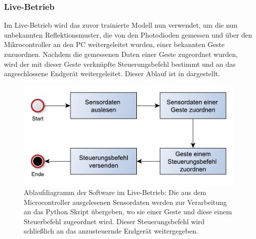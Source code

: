 \subsubsection*{Live-Betrieb}
Im Live-Betrieb wird das zuvor trainierte Modell nun verwendet, um die nun unbekannten Reflektionsmuster, die von den Photodioden gemessen und über den Mikrocontroller an den PC weitergeleitet wurden, einer bekannten Geste zuzuordnen. Nachdem die gemessenen Daten einer Geste zugeordnet wurden, wird der mit dieser Geste verknüpfte Steuerungsbefehl bestimmt und an das angeschlossene Endgerät weitergeleitet. Dieser Ablauf ist in  dargestellt.

\begin{figure}[h]
	\centering
	\includegraphics[scale=0.75]{../figures/AblaufSteuerung.pdf}
	\caption{Ablaufdiagramm der Software im Live-Betrieb: Die aus dem Microcontroller ausgelesenen Sensordaten werden zur Verarbeitung an das Python Skript übergeben, wo sie einer Geste und diese einem Steuerbefehl zugeordnet wird. Dieser Steuerungsbefehl wird schließlich an das anzusteuernde Endgerät weitergegeben.}
	\label{fig:AblaufSteuerung}
\end{figure}